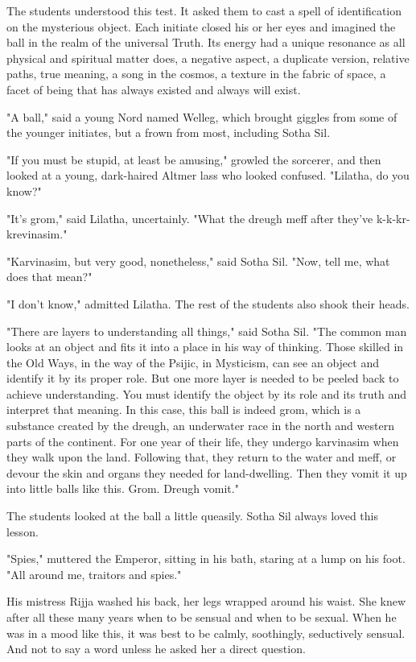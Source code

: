 The students understood this test. It asked them to cast a spell of identification on the mysterious object. Each initiate closed his or her eyes and imagined the ball in the realm of the universal Truth. Its energy had a unique resonance as all physical and spiritual matter does, a negative aspect, a duplicate version, relative paths, true meaning, a song in the cosmos, a texture in the fabric of space, a facet of being that has always existed and always will exist.

"A ball," said a young Nord named Welleg, which brought giggles from some of the younger initiates, but a frown from most, including Sotha Sil.

"If you must be stupid, at least be amusing," growled the sorcerer, and then looked at a young, dark-haired Altmer lass who looked confused. "Lilatha, do you know?"

"It's grom," said Lilatha, uncertainly. "What the dreugh meff after they've k-k-kr-krevinasim."

"Karvinasim, but very good, nonetheless," said Sotha Sil. "Now, tell me, what does that mean?"

"I don't know," admitted Lilatha. The rest of the students also shook their heads.

"There are layers to understanding all things," said Sotha Sil. "The common man looks at an object and fits it into a place in his way of thinking. Those skilled in the Old Ways, in the way of the Psijic, in Mysticism, can see an object and identify it by its proper role. But one more layer is needed to be peeled back to achieve understanding. You must identify the object by its role and its truth and interpret that meaning. In this case, this ball is indeed grom, which is a substance created by the dreugh, an underwater race in the north and western parts of the continent. For one year of their life, they undergo karvinasim when they walk upon the land. Following that, they return to the water and meff, or devour the skin and organs they needed for land-dwelling. Then they vomit it up into little balls like this. Grom. Dreugh vomit."

The students looked at the ball a little queasily. Sotha Sil always loved this lesson.

"Spies," muttered the Emperor, sitting in his bath, staring at a lump on his foot. "All around me, traitors and spies."

His mistress Rijja washed his back, her legs wrapped around his waist. She knew after all these many years when to be sensual and when to be sexual. When he was in a mood like this, it was best to be calmly, soothingly, seductively sensual. And not to say a word unless he asked her a direct question.

